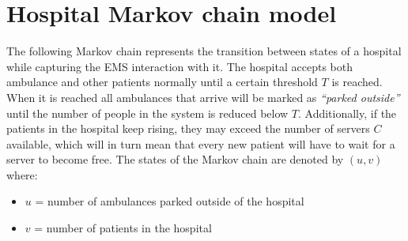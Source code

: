 \section{Hospital Markov chain model}
The following Markov chain represents the transition between states of a hospital while capturing the EMS interaction with it. The hospital accepts both ambulance and other patients normally until a certain threshold \(T\) is reached. When it is reached all ambulances that arrive will be marked as \textit{``parked outside''} until the number of people in the system is reduced below \(T\). Additionally, if the patients in the hospital keep rising, they may exceed the number of servers \(C\) available, which will in turn mean that every new patient will have to wait for a server to become free. The states of the Markov chain are denoted by \((u,v)\) where:

\begin{itemize}
    \item \(u\) = number of ambulances parked outside of the hospital
    \item \(v\) = number of patients in the hospital
\end{itemize}

